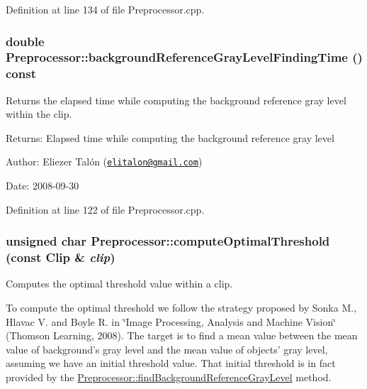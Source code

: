 Definition at line 134 of file Preprocessor.cpp.\hypertarget{class_preprocessor_3189cad5515476d54cc14effcf983fc7}{
\subsubsection[backgroundReferenceGrayLevelFindingTime]{\setlength{\rightskip}{0pt plus 5cm}double Preprocessor::backgroundReferenceGrayLevelFindingTime () const}}
\label{class_preprocessor_3189cad5515476d54cc14effcf983fc7}


Returns the elapsed time while computing the background reference gray level within the clip. 

\begin{Desc}
\item[Returns:]Elapsed time while computing the background reference gray level\end{Desc}
\begin{Desc}
\item[Author:]Eliezer Talón (\href{mailto:elitalon@gmail.com}{\tt elitalon@gmail.com}) \end{Desc}
\begin{Desc}
\item[Date:]2008-09-30 \end{Desc}


Definition at line 122 of file Preprocessor.cpp.\hypertarget{class_preprocessor_0e146cafa6b8b31f4f4ed189a970db7a}{
\subsubsection[computeOptimalThreshold]{\setlength{\rightskip}{0pt plus 5cm}unsigned char Preprocessor::computeOptimalThreshold (const {\bf Clip} \& {\em clip})}}
\label{class_preprocessor_0e146cafa6b8b31f4f4ed189a970db7a}


Computes the optimal threshold value within a clip. 

To compute the optimal threshold we follow the strategy proposed by Sonka M., Hlavac V. and Boyle R. in \char`\"{}Image Processing, Analysis and Machine Vision\char`\"{} (Thomson Learning, 2008). The target is to find a mean value between the mean value of background's gray level and the mean value of objects' gray level, assuming we have an initial threshold value. That initial threshold is in fact provided by the \hyperlink{class_preprocessor_19aa90451cf6f99854833c05d3e71270}{Preprocessor::findBackgroundReferenceGrayLevel} method.

